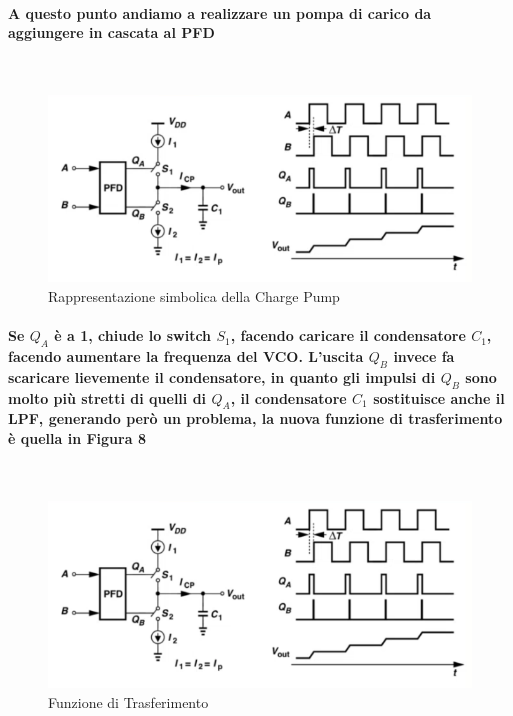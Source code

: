 \documentclass{article}
\begin{document}
\paragraph{A questo punto andiamo a realizzare un pompa di carico da aggiungere in cascata al PFD}
~\begin{figure}[!h]%
\includegraphics[scale=0.8]{CP.png} 
\caption{Rappresentazione simbolica della Charge Pump}
\label{fig:foo}
\end{figure}
\paragraph{Se $Q_A$ è a 1, chiude lo switch $S_1$, facendo caricare il condensatore $C_1$, facendo aumentare la frequenza del VCO.
L'uscita $Q_B$ invece fa scaricare lievemente il condensatore, in quanto gli impulsi di $Q_B$ sono molto più stretti di quelli di $Q_A$, il condensatore $C_1$ sostituisce anche il LPF, generando però un problema, la nuova funzione di trasferimento è quella in Figura 8}
~\begin{figure}[!h]%
\includegraphics[scale=0.8]{CP.png} 
\caption{Funzione di Trasferimento}
\label{fig:foo}
\end{figure}
\end{document}
